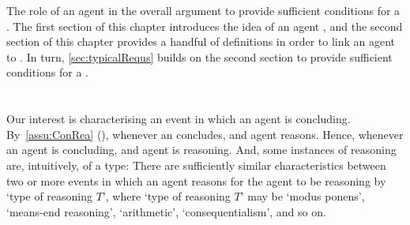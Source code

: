 \begin{note}
  The role of an agent \tCV{} in the overall argument to provide sufficient conditions for a \requ{}.
  The first section of this chapter introduces the idea of an agent \tCV{}, and the second section of this chapter provides a handful of definitions in order to link an agent \tCN{} to .
  In turn, \autoref{sec:typicalRequs} builds on the second section to provide sufficient conditions for a \requ{}.
\end{note}



\section{}
\label{cha:typical:int}

\begin{note}
  Our interest is characterising an event in which an agent is concluding.
  By~\autoref{assu:ConRea} (), whenever an concludes, and agent reasons.
  Hence, whenever an agent is concluding, and agent is reasoning.
  And, some instances of reasoning are, intuitively, of a type:
  There are sufficiently similar characteristics between two or more events in which an agent reasons for the agent to be reasoning by `type of reasoning \(T\)', where `type of reasoning \(T\)' may be `modus ponens', `means-end reasoning',%
  `arithmetic', `consequentialism', and so on.
\end{note}


